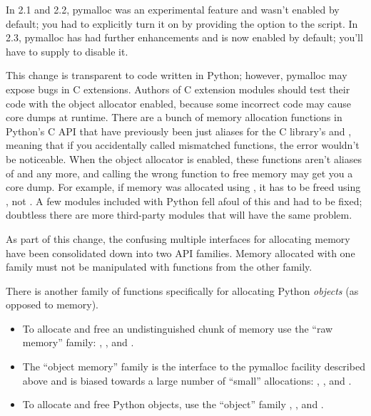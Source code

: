 \documentclass{howto}
\begin{document}
In 2.1 and 2.2, pymalloc was an experimental feature and wasn't
enabled by default; you had to explicitly turn it on by providing the
 option to the 
script.  In 2.3, pymalloc has had further enhancements and is now
enabled by default; you'll have to supply
 to disable it.

This change is transparent to code written in Python; however,
pymalloc may expose bugs in C extensions.  Authors of C extension
modules should test their code with the object allocator enabled,
because some incorrect code may cause core dumps at runtime.  There
are a bunch of memory allocation functions in Python's C API that have
previously been just aliases for the C library's 
and , meaning that if you accidentally called
mismatched functions, the error wouldn't be noticeable.  When the
object allocator is enabled, these functions aren't aliases of
 and  any more, and calling the
wrong function to free memory may get you a core dump.  For example,
if memory was allocated using , it has to
be freed using , not .  A
few modules included with Python fell afoul of this and had to be
fixed; doubtless there are more third-party modules that will have the
same problem.

As part of this change, the confusing multiple interfaces for
allocating memory have been consolidated down into two API families.
Memory allocated with one family must not be manipulated with
functions from the other family.

There is another family of functions specifically for allocating
Python \emph{objects} (as opposed to memory).

\begin{itemize}
  \item To allocate and free an undistinguished chunk of memory use
  the ``raw memory'' family: ,
  , and .

  \item The ``object memory'' family is the interface to the pymalloc
  facility described above and is biased towards a large number of
  ``small'' allocations: ,
  , and .

  \item To allocate and free Python objects, use the ``object'' family
  , , and
  .
\end{itemize}
\end{document}
